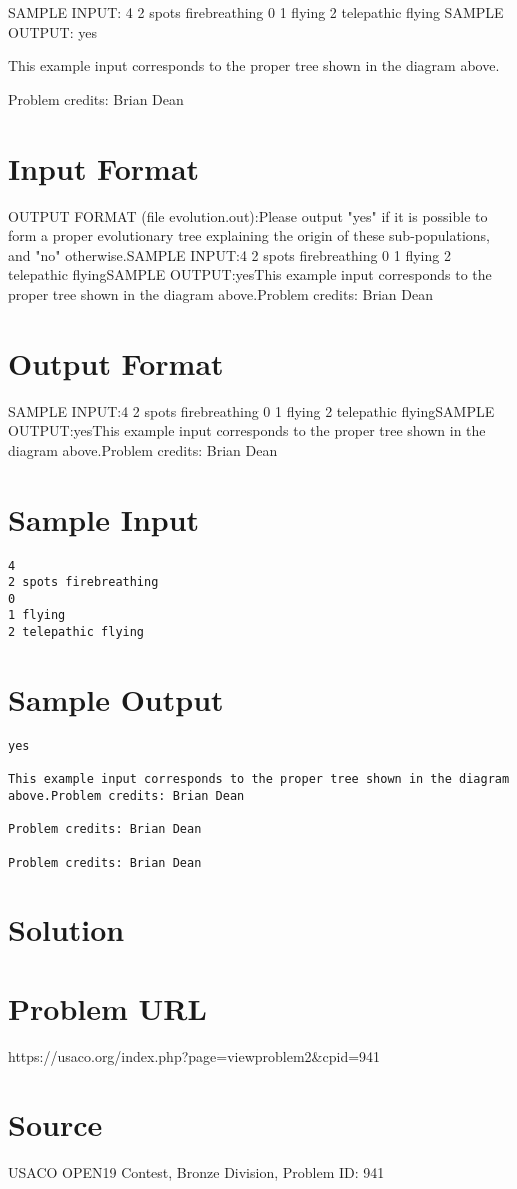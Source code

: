 \documentclass[12pt]{article}
\begin{document}
SAMPLE INPUT:
4
2 spots firebreathing
0
1 flying
2 telepathic flying
SAMPLE OUTPUT: 
yes

This example input corresponds to the proper tree shown in the diagram above.


Problem credits: Brian Dean



\section*{Input Format}
OUTPUT FORMAT (file evolution.out):Please output "yes" if it is possible to form a proper evolutionary tree
explaining the origin of these sub-populations, and "no" otherwise.SAMPLE INPUT:4
2 spots firebreathing
0
1 flying
2 telepathic flyingSAMPLE OUTPUT:yesThis example input corresponds to the proper tree shown in the diagram above.Problem credits: Brian Dean

\section*{Output Format}
SAMPLE INPUT:4
2 spots firebreathing
0
1 flying
2 telepathic flyingSAMPLE OUTPUT:yesThis example input corresponds to the proper tree shown in the diagram above.Problem credits: Brian Dean

\section*{Sample Input}
\begin{verbatim}
4
2 spots firebreathing
0
1 flying
2 telepathic flying
\end{verbatim}

\section*{Sample Output}
\begin{verbatim}
yes

This example input corresponds to the proper tree shown in the diagram above.Problem credits: Brian Dean

Problem credits: Brian Dean

Problem credits: Brian Dean
\end{verbatim}

\section*{Solution}


\section*{Problem URL}
https://usaco.org/index.php?page=viewproblem2&cpid=941

\section*{Source}
USACO OPEN19 Contest, Bronze Division, Problem ID: 941
\end{document}
